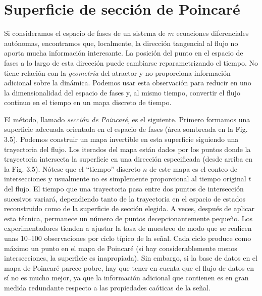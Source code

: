 \documentclass[10pt,a4paper]{book}
\begin{document}
\newpage

\section{Superficie de sección de Poincaré}

Si consideramos el espacio de fases de un sistema de $m$ ecuaciones diferenciales autónomas, encontramos que, localmente, la dirección tangencial al flujo no aporta mucha información interesante. La posición del punto en el espacio de fases a lo largo de esta dirección puede cambiarse reparametrizando el tiempo. No tiene relación con la \textit{geometría} del atractor y no proporciona información adicional sobre la dinámica. Podemos usar esta observación para reducir en uno la dimensionalidad del espacio de fases y, al mismo tiempo, convertir el flujo continuo en el tiempo en un mapa discreto de tiempo.

El método, llamado \textit{sección de Poincaré}, es el siguiente. Primero formamos una superficie adecuada orientada en el espacio de fases (área sombreada en la Fig. 3.5). Podemos construir un mapa invertible en esta superficie siguiendo una trayectoria del flujo. Los iterados del mapa están dados por los puntos donde la trayectoria intersecta la superficie en una dirección especificada (desde arriba en la Fig. 3.5). Nótese que el “tiempo” discreto $n$ de este mapa es el conteo de intersecciones y usualmente no es simplemente proporcional al tiempo original $t$ del flujo. El tiempo que una trayectoria pasa entre dos puntos de intersección sucesivos variará, dependiendo tanto de la trayectoria en el espacio de estados reconstruido como de la superficie de sección elegida. A veces, después de aplicar esta técnica, permanece un número de puntos decepcionantemente pequeño. Los experimentadores tienden a ajustar la tasa de muestreo de modo que se realicen unas 10–100 observaciones por ciclo típico de la señal. Cada ciclo produce como máximo un punto en el mapa de Poincaré (si hay considerablemente menos intersecciones, la superficie es inapropiada). Sin embargo, si la base de datos en el mapa de Poincaré parece pobre, hay que tener en cuenta que el flujo de datos en sí no es mucho mejor, ya que la información adicional que contienen es en gran medida redundante respecto a las propiedades caóticas de la señal.

\bigskip
\end{document}

